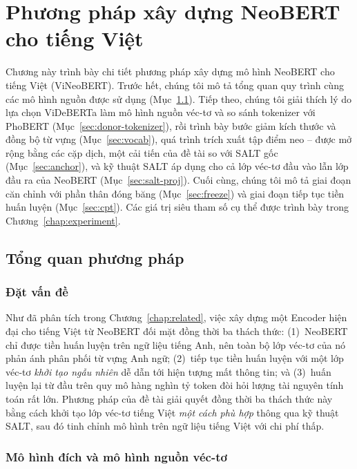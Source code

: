 \chapter{Phương pháp xây dựng NeoBERT cho tiếng Việt}
\label{chap:method}

Chương này trình bày chi tiết phương pháp xây dựng mô hình NeoBERT cho tiếng Việt
(ViNeoBERT). Trước hết, chúng tôi mô tả tổng quan quy trình cùng các mô hình
nguồn được sử dụng (Mục~\ref{sec:method-overview}). Tiếp theo, chúng tôi giải thích lý do
lựa chọn ViDeBERTa làm mô hình nguồn véc-tơ và so sánh tokenizer với PhoBERT
(Mục~\ref{sec:donor-tokenizer}), rồi trình bày bước giảm kích thước và đồng bộ từ vựng
(Mục~\ref{sec:vocab}), quá trình trích xuất tập điểm neo -- được mở rộng bằng các cặp dịch, một
cải tiến của đề tài so với SALT gốc (Mục~\ref{sec:anchor}), và kỹ thuật SALT áp dụng
cho cả lớp véc-tơ đầu vào lẫn lớp đầu ra của NeoBERT (Mục~\ref{sec:salt-proj}).
Cuối cùng, chúng tôi mô tả giai đoạn căn chỉnh với phần thân đóng băng (Mục~\ref{sec:freeze}) và giai
đoạn tiếp tục tiền huấn luyện (Mục~\ref{sec:cpt}). Các giá trị siêu tham số cụ
thể được trình bày trong Chương~\ref{chap:experiment}.

\section{Tổng quan phương pháp}
\label{sec:method-overview}

\subsection{Đặt vấn đề}
\label{subsec:problem}

Như đã phân tích trong Chương~\ref{chap:related}, việc xây dựng một Encoder hiện đại cho
tiếng Việt từ NeoBERT đối mặt đồng thời ba thách thức: (1)~NeoBERT chỉ được tiền huấn luyện
trên ngữ liệu tiếng Anh, nên toàn bộ lớp véc-tơ của nó phản ánh phân phối từ vựng Anh ngữ;
(2)~tiếp tục tiền huấn luyện với một lớp véc-tơ \textit{khởi tạo ngẫu nhiên} dễ dẫn tới hiện
tượng mất thông tin; và (3)~huấn luyện lại từ đầu trên quy mô hàng nghìn tỷ token đòi hỏi
lượng tài nguyên tính toán rất lớn. Phương pháp của đề tài giải quyết đồng thời ba thách thức này
bằng cách khởi tạo lớp véc-tơ tiếng Việt \textit{một cách phù hợp} thông qua kỹ thuật SALT, sau
đó tinh chỉnh mô hình trên ngữ liệu tiếng Việt với chi phí thấp.

\subsection{Mô hình đích và mô hình nguồn véc-tơ}
\label{subsec:sources}

